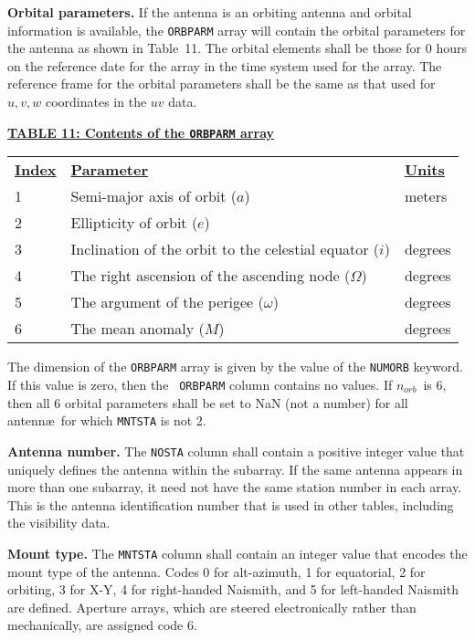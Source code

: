 \documentclass[twoside]{article}
\newcommand{\norb}{$n_{orb}$}
\begin{document}
{\bf Orbital parameters.} If the antenna is an orbiting antenna and
orbital information is available, the {\tt ORBPARM} array will
contain the orbital parameters for the antenna as shown in
Table~11.  The orbital elements shall be those for 0 hours on the
reference date for the array in the time system used for the array.
The reference frame for the orbital parameters shall be the same as
that used for $u,v,w$ coordinates in the $uv$ data.

\begin{center}
\underline{\bf{TABLE 11: Contents of the {\tt ORBPARM} array}} \\
\begin{tabular}{lll}
\noalign{\vspace{2pt}} \label{ta:ANorbparms}
\underline{{\bf Index\vphantom{y}}} &
   \underline{\bf{Parameter\vphantom{y}}} &
   \underline{{\bf Units\vphantom{y}}} \\
\noalign{\vspace{2pt}}
1  & Semi-major axis of orbit ($a$) & meters \\
2  & Ellipticity of orbit ($e$)          &  \\
3  & Inclination of the orbit to the celestial equator ($i$) & degrees \\
4  & The right ascension of the ascending node ($\Omega$)  & degrees \\
5  & The argument of the perigee ($\omega$)  & degrees \\
6  & The mean anomaly ($M$)  & degrees
\end{tabular}
\end{center}

The dimension of the {\tt ORBPARM} array is given by the value of
the {\tt NUMORB} keyword.  If this value is zero, then the {\tt
  ORBPARM} column contains no values.  If \norb\ is 6,
then all 6 orbital parameters shall be set to NaN (not a number)
for all antenn\ae\ for which {\tt MNTSTA} is not 2.

{\bf Antenna number.} The {\tt NOSTA} column shall contain a positive
integer value that uniquely defines the antenna within the subarray.
If the same antenna appears in more than one subarray, it need not
have the same station number in each array.  This is the antenna
identification number that is used in other tables, including the
visibility data.

{\bf Mount type.} The {\tt MNTSTA} column shall contain an integer
value that encodes the mount type of the antenna.  Codes 0 for
alt-azimuth, 1 for equatorial, 2 for orbiting, 3 for X-Y, 4 for
right-handed Naismith, and 5 for left-handed Naismith are defined.
Aperture arrays, which are steered electronically rather than
mechanically, are assigned code 6.
\end{document}
